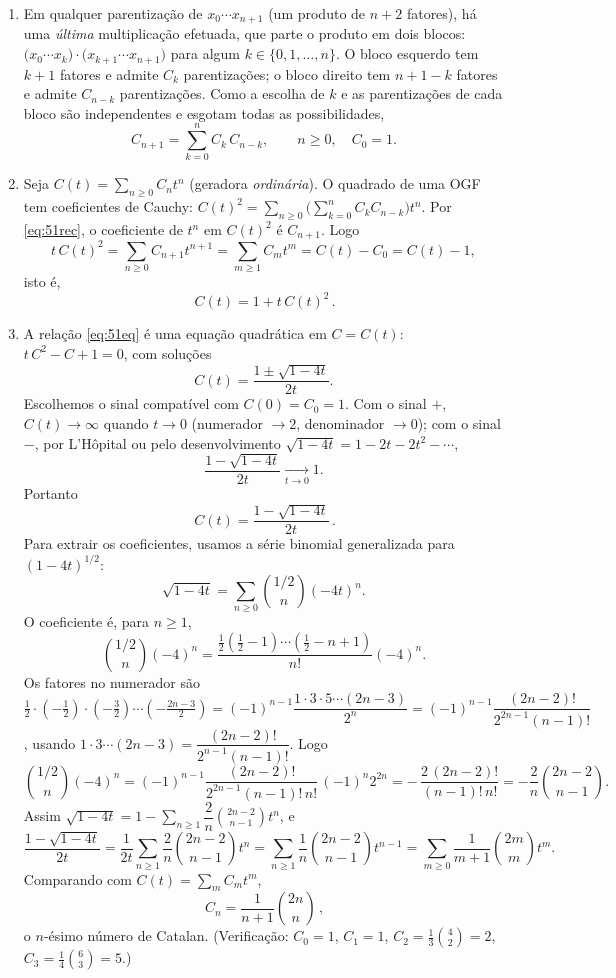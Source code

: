 \begin{enumerate}[label=(\alph*)]

\item Em qualquer parentização de $x_0\cdots x_{n+1}$ (um produto de $n+2$ fatores), há uma \emph{última} multiplicação efetuada, que parte o produto em dois blocos: $\big(x_0\cdots x_k\big)\cdot\big(x_{k+1}\cdots x_{n+1}\big)$ para algum $k\in\{0,1,\dots,n\}$. O bloco esquerdo tem $k+1$ fatores e admite $C_k$ parentizações; o bloco direito tem $n+1-k$ fatores e admite $C_{n-k}$ parentizações. Como a escolha de $k$ e as parentizações de cada bloco são independentes e esgotam todas as possibilidades,
\begin{equation}\label{eq:51rec}
C_{n+1}=\sum_{k=0}^n C_k\,C_{n-k},\qquad n\ge0,\quad C_0=1.
\end{equation}

\item Seja $C(t)=\sum_{n\ge0}C_n t^n$ (geradora \emph{ordinária}). O quadrado de uma OGF tem coeficientes de Cauchy: $C(t)^2=\sum_{n\ge0}\big(\sum_{k=0}^n C_kC_{n-k}\big)t^n$. Por \eqref{eq:51rec}, o coeficiente de $t^n$ em $C(t)^2$ é $C_{n+1}$. Logo
\[
t\,C(t)^2=\sum_{n\ge0}C_{n+1}t^{n+1}=\sum_{m\ge1}C_m t^m=C(t)-C_0=C(t)-1,
\]
isto é,
\begin{equation}\label{eq:51eq}
\boxed{\,C(t)=1+t\,C(t)^2\,}.
\end{equation}

\item A relação \eqref{eq:51eq} é uma equação quadrática em $C=C(t)$: $t\,C^2-C+1=0$, com soluções
\[
C(t)=\frac{1\pm\sqrt{1-4t}}{2t}.
\]
Escolhemos o sinal compatível com $C(0)=C_0=1$. Com o sinal $+$, $C(t)\to\infty$ quando $t\to0$ (numerador $\to2$, denominador $\to0$); com o sinal $-$, por L'Hôpital ou pelo desenvolvimento $\sqrt{1-4t}=1-2t-2t^2-\cdots$,
\[
\frac{1-\sqrt{1-4t}}{2t}\xrightarrow[t\to0]{}1.
\]
Portanto
\[
\boxed{\,C(t)=\frac{1-\sqrt{1-4t}}{2t}\,}.
\]
Para extrair os coeficientes, usamos a série binomial generalizada para $(1-4t)^{1/2}$:
\[
\sqrt{1-4t}=\sum_{n\ge0}\binom{1/2}{n}(-4t)^n.
\]
O coeficiente é, para $n\ge1$,
\[
\binom{1/2}{n}(-4)^n=\frac{\tfrac12(\tfrac12-1)\cdots(\tfrac12-n+1)}{n!}(-4)^n.
\]
Os fatores no numerador são $\tfrac12\cdot(-\tfrac12)\cdot(-\tfrac32)\cdots(-\tfrac{2n-3}{2})=(-1)^{n-1}\dfrac{1\cdot3\cdot5\cdots(2n-3)}{2^n}=(-1)^{n-1}\dfrac{(2n-2)!}{2^{2n-1}(n-1)!}$, usando $1\cdot3\cdots(2n-3)=\dfrac{(2n-2)!}{2^{n-1}(n-1)!}$. Logo
\[
\binom{1/2}{n}(-4)^n=(-1)^{n-1}\frac{(2n-2)!}{2^{2n-1}(n-1)!\,n!}\,(-1)^n 2^{2n}
=-\,\frac{2\,(2n-2)!}{(n-1)!\,n!}=-\frac{2}{n}\binom{2n-2}{n-1}.
\]
Assim $\sqrt{1-4t}=1-\sum_{n\ge1}\dfrac{2}{n}\binom{2n-2}{n-1}t^n$, e
\[
\frac{1-\sqrt{1-4t}}{2t}=\frac{1}{2t}\sum_{n\ge1}\frac{2}{n}\binom{2n-2}{n-1}t^n
=\sum_{n\ge1}\frac1n\binom{2n-2}{n-1}t^{n-1}
=\sum_{m\ge0}\frac{1}{m+1}\binom{2m}{m}t^{m}.
\]
Comparando com $C(t)=\sum_m C_m t^m$,
\[
\boxed{\,C_n=\frac{1}{n+1}\binom{2n}{n}\,},
\]
o $n$-ésimo número de Catalan. (Verificação: $C_0=1$, $C_1=1$, $C_2=\tfrac13\binom42=2$, $C_3=\tfrac14\binom63=5$.)

\end{enumerate}


